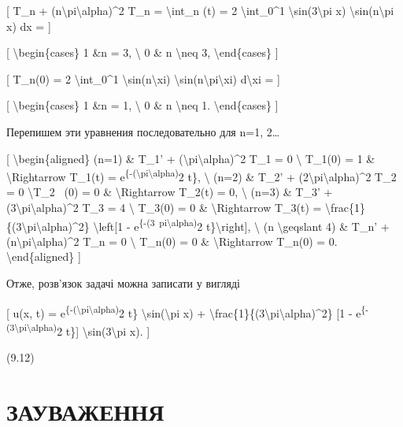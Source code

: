 \documentclass[
]{article}
\begin{document}
{[} T\_n + (n\textbackslash pi\textbackslash alpha)\^{}2 T\_n =
\textbackslash int\_n (t) = 2 \textbackslash int\_0\^{}1
\textbackslash sin(3\textbackslash pi x)
\textbackslash sin(n\textbackslash pi x) dx = {]}

{[} \textbackslash begin\{cases\} 1 \&n = 3, \textbackslash{} 0 \& n
\textbackslash neq 3, \textbackslash end\{cases\} {]}

{[} T\_n(0) = 2 \textbackslash int\_0\^{}1
\textbackslash sin(n\textbackslash xi)
\textbackslash sin(n\textbackslash pi\textbackslash xi)
d\textbackslash xi = {]}

{[} \textbackslash begin\{cases\} 1 \&n = 1, \textbackslash{} 0 \& n
\textbackslash neq 1. \textbackslash end\{cases\} {]}

Перепишем эти уравнения последовательно для n=1, 2\ldots{}

{[} \textbackslash begin\{aligned\} (n=1) \& T\_1' +
(\textbackslash pi\textbackslash alpha)\^{}2 T\_1 = 0 \textbackslash{}
T\_1(0) = 1 \& \textbackslash Rightarrow T\_1(t) =
e\textsuperscript{\{-(\textbackslash pi\textbackslash alpha)}2 t\},
\textbackslash{} (n=2) \& T\_2' +
(2\textbackslash pi\textbackslash alpha)\^{}2 T\_2 = 0
\textbackslash T\_2~ (0) = 0 \& \textbackslash Rightarrow T\_2(t) = 0,
\textbackslash{} (n=3) \& T\_3' +
(3\textbackslash pi\textbackslash alpha)\^{}2 T\_3 = 4 \textbackslash{}
T\_3(0) = 0 \& \textbackslash Rightarrow T\_3(t) =
\textbackslash frac\{1\}\{(3\textbackslash pi\textbackslash alpha)\^{}2\}
\textbackslash left{[}1 -
e\textsuperscript{\{-(3~pi\textbackslash alpha)}2
t\}\textbackslash right{]}, \textbackslash{} (n \textbackslash geqslant
4) \& T\_n' + (n\textbackslash pi\textbackslash alpha)\^{}2 T\_n = 0
\textbackslash{} T\_n(0) = 0 \& \textbackslash Rightarrow T\_n(0) = 0.
\textbackslash end\{aligned\} {]}

Отже, розв'язок задачі можна записати у вигляді

{[} u(x, t) =
e\textsuperscript{\{-(\textbackslash pi\textbackslash alpha)}2 t\}
\textbackslash sin(\textbackslash pi x) +
\textbackslash frac\{1\}\{(3\textbackslash pi\textbackslash alpha)\^{}2\}
{[}1 - e\textsuperscript{\{-(3\textbackslash pi\textbackslash alpha)}2
t\}{]} \textbackslash sin(3\textbackslash pi x). {]}

(9.12)

\section{ЗАУВАЖЕННЯ}\label{ux437ux430ux443ux432ux430ux436ux435ux43dux43dux44f-4}
\end{document}
